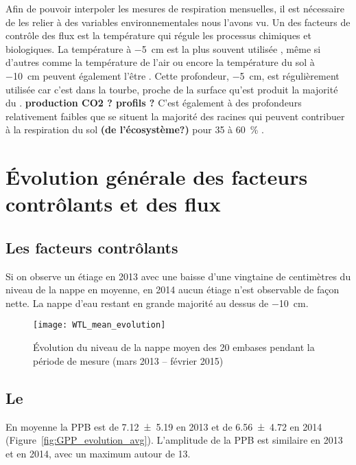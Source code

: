 Afin de pouvoir interpoler les mesures de respiration mensuelles, il est nécessaire de les relier à des variables environnementales nous l'avons vu.
Un des facteurs de contrôle des flux est la température qui régule les processus chimiques et biologiques.
La température à \SI{-5}{\cm} est la plus souvent utilisée \cite{ballantyne2014}, même si d'autres comme la température de l'air ou encore la température du sol à \SI{-10}{\cm} peuvent également l'être \cite{bortoluzzi2006,kim1992}.
Cette profondeur, \SI{-5}{\cm}, est régulièrement utilisée car c'est dans la tourbe, proche de la surface qu'est produit la majorité du \coo.
\textbf{production CO2 ? profils ?}
C'est également à des profondeurs relativement faibles que se situent la majorité des racines \plop qui peuvent contribuer à la respiration du sol \textbf{(de l'écosystème?)} pour 35 à \SI{60}{\percent} \cite{silvola1996a,crow2005}.

\section{Évolution générale des facteurs contrôlants et des flux}

\subsection{Les facteurs contrôlants}

Si on observe un étiage en 2013 avec une baisse d'une vingtaine de centimètres du niveau de la nappe en moyenne, en 2014 aucun étiage n'est observable de façon nette.
La nappe d'eau restant en grande majorité au dessus de \SI{-10}{\cm}.

\begin{figure}
\centering
\texttt{[image: WTL\_mean\_evolution]}
\caption{Évolution du niveau de la nappe moyen des 20 embases pendant la période de mesure (mars 2013 -- février 2015)}
\label{fig:WTL_mean_evolution}
\end{figure}

\subsection{Le \coo}


En moyenne la PPB est de \SI{7.12(519)}{\uml} en 2013 et de \SI{6.56(472)}{\uml} en 2014 (Figure~\ref{fig:GPP_evolution_avg}).
L'amplitude de la PPB est similaire en 2013 et en 2014, avec un maximum autour de \SI{13}{\uml}.

